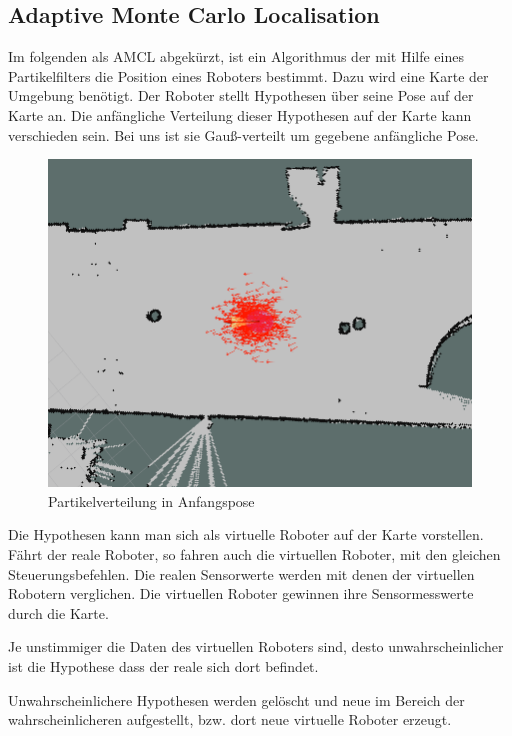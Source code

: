 \documentclass[11pt,a4paper]{article}
\begin{document}
{{	}
\subsection{Adaptive  Monte Carlo Localisation \cite{mclWiki}}
Im folgenden als AMCL abgek\"urzt, ist ein Algorithmus der mit Hilfe eines Partikelfilters die Position eines Roboters bestimmt. Dazu wird eine Karte der Umgebung ben\"otigt. Der Roboter stellt Hypothesen \"uber seine Pose auf der Karte an. Die anf\"angliche Verteilung dieser Hypothesen auf der Karte kann verschieden sein. 
Bei uns ist sie Gau{\ss}-verteilt um gegebene anfängliche Pose. 

\begin{figure}[h]
	\includegraphics[width=\linewidth]{pictures/initial_distribution.jpg}
	\caption{Partikelverteilung in Anfangspose}
\end{figure}

Die Hypothesen kann man sich als virtuelle Roboter auf der Karte vorstellen. F\"ahrt der reale Roboter, so fahren auch die virtuellen Roboter, mit den gleichen Steuerungsbefehlen. Die realen Sensorwerte werden mit denen der virtuellen Robotern verglichen. Die virtuellen Roboter gewinnen ihre Sensormesswerte durch die Karte.

Je unstimmiger die Daten des virtuellen Roboters sind, desto unwahrscheinlicher ist die Hypothese dass der reale sich dort befindet. 

Unwahrscheinlichere Hypothesen werden gel\"oscht und neue im Bereich der wahrscheinlicheren aufgestellt, bzw. dort neue virtuelle Roboter erzeugt.

}
\end{document}
